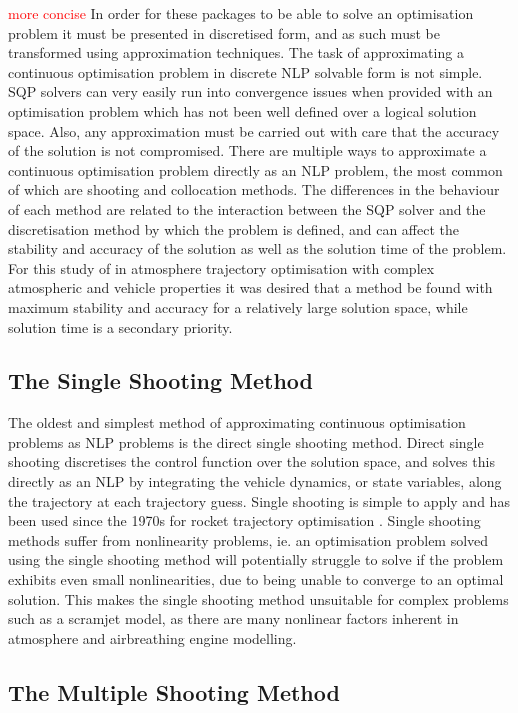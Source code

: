 \textcolor{red}{more concise}
In order for these packages to be able to solve an optimisation problem it must be presented in discretised form, and as such must be transformed using approximation techniques. The task of approximating a continuous optimisation problem in discrete NLP solvable form is not simple. SQP solvers can very easily run into convergence issues when provided with an optimisation problem which has not been well defined over a logical solution space. Also, any approximation must be carried out with care that the accuracy of the solution is not compromised. There are multiple ways to approximate a continuous optimisation problem directly as an NLP problem, the most common of which are shooting and collocation methods. The differences in the behaviour of each method are related to the interaction between the SQP solver and the discretisation method by which the problem is defined, and can affect the stability and accuracy of the solution as well as the solution time of the problem. For this study of in atmosphere trajectory optimisation with complex atmospheric and vehicle properties it was desired that a method be found with maximum stability and accuracy for a relatively large solution space, while solution time is a secondary priority.

\subsection{The Single Shooting Method}


The oldest and simplest method of approximating continuous optimisation problems as NLP problems is the direct single shooting method. Direct single shooting discretises the control function over the solution space, and solves this directly as an NLP by integrating the vehicle dynamics, or state variables, along the trajectory at each trajectory guess. Single shooting is simple to apply and has been used since the 1970s for rocket trajectory optimisation \cite{jezewski1971}. Single shooting methods suffer from nonlinearity problems, ie. an optimisation problem solved using the single shooting method will potentially struggle to solve if the problem exhibits even small nonlinearities, due to being unable to converge to an optimal solution. This makes the single shooting method unsuitable for complex problems such as a scramjet model, as there are many nonlinear factors inherent in atmosphere and airbreathing engine modelling. 
\subsection{The Multiple Shooting Method}



